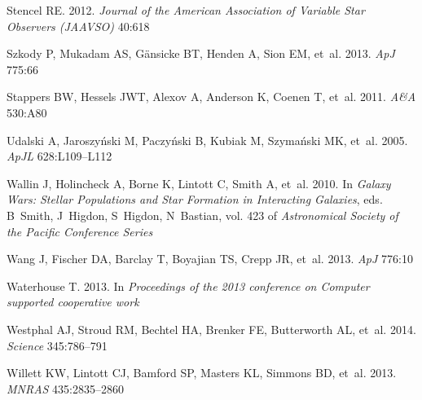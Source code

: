 \documentclass{ar2e}
\def\apj{ApJ}
\def\apjl{ApJL}
\def\aap{A{\&}A}
\def\mnras{MNRAS}
\begin{document}
\begin{thebibliography}{}
{Stencel} RE. 2012.
\newblock \textit{Journal of the American Association of Variable Star
  Observers (JAAVSO)} 40:618

{Szkody} P, {Mukadam} AS, {G{\"a}nsicke} BT, {Henden} A, {Sion} EM, et~al.
  2013.
\newblock \textit{\apj} 775:66

{Stappers} BW, {Hessels} JWT, {Alexov} A, {Anderson} K, {Coenen} T, et~al.
  2011.
\newblock \textit{\aap} 530:A80

{Udalski} A, {Jaroszy{\'n}ski} M, {Paczy{\'n}ski} B, {Kubiak} M,
  {Szyma{\'n}ski} MK, et~al. 2005.
\newblock \textit{\apjl} 628:L109--L112

{Wallin} J, {Holincheck} A, {Borne} K, {Lintott} C, {Smith} A, et~al. 2010.
\newblock In \textit{Galaxy Wars: Stellar Populations and Star Formation in
  Interacting Galaxies}, eds. B~{Smith}, J~{Higdon}, S~{Higdon}, N~{Bastian},
  vol. 423 of \textit{Astronomical Society of the Pacific Conference Series}

{Wang} J, {Fischer} DA, {Barclay} T, {Boyajian} TS, {Crepp} JR, et~al. 2013.
\newblock \textit{\apj} 776:10

{Waterhouse} T. 2013.
\newblock In \textit{Proceedings of the 2013 conference on Computer supported
  cooperative work}

{Westphal} AJ, {Stroud} RM, {Bechtel} HA, {Brenker} FE, {Butterworth} AL,
  et~al. 2014.
\newblock \textit{Science} 345:786--791

{Willett} KW, {Lintott} CJ, {Bamford} SP, {Masters} KL, {Simmons} BD, et~al.
  2013.
\newblock \textit{\mnras} 435:2835--2860

\end{thebibliography}



\end{document}
